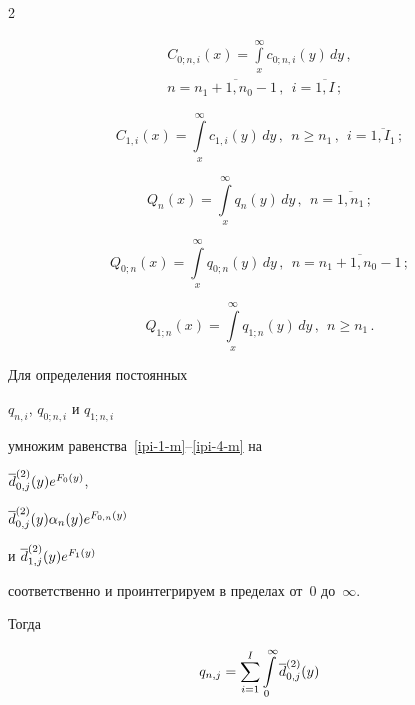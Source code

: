 \begin{multicols}{2}
\noindent


\begin{multline*}


C_{0;n,i}(x)= \int\limits_x^\infty c_{0;n,i}(y)\, dy\,, \\ 


n=\overline{n_1+1,n_0-1}\,,\ \ i=\overline{1,I}\,;


\end{multline*}


$$


C_{1,i}(x) = \int\limits_x^\infty c_{1,i}(y)\, dy\,,


\ \ n\ge n_1\,,\ \ i=\overline{1,I_1}\,;


$$




$$


Q_{n}(x) = \int\limits_x^\infty q_{n}(y)\, dy\,,


\ \ n=\overline{1,n_1}\,;


$$


$$


Q_{0;n}(x)= \int\limits_x^\infty q_{0;n}(y)\, dy\,,


\ \ n=\overline{n_1+1,n_0-1}\,;


$$


$$


Q_{1;n}(x)= \int\limits_x^\infty q_{1;n}(y)\, dy\,,


\ \ n\ge n_1\,.


$$





Для определения постоянных


$q_{n,i}$, $q_{0;n,i}$ и $q_{1;n,i}$


умножим равенства~\eqref{ipi-1-m}--\eqref{ipi-4-m} на


$\overline d^{(2)}_{0,j}(y) e^{F_0(y)}$,


$\overline d^{(2)}_{0,j}(y) \alpha_n(y) e^{F_{0,n}(y)}$


и $\overline d^{(2)}_{1,j}(y) e^{F_{1}(y)}$


соответственно и проинтегрируем в пределах от~0 до~$\infty$.


Тогда




\begin{multline}


\label{cons-1-m}


q_{n,j}= \sum\limits_{i=1}^{I} \int\limits_0^\infty \d^{(2)}_{0,j}(y) 



\end{multline}
\end{multicols}
